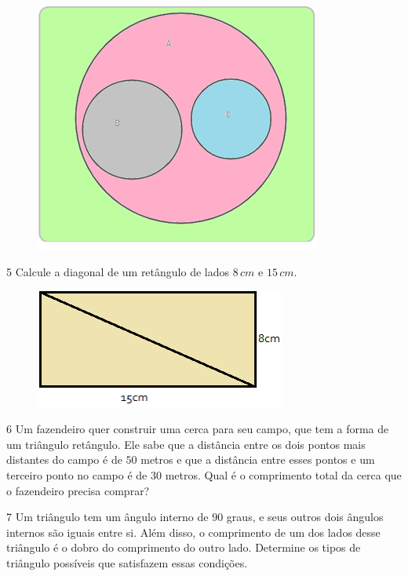 {\begin{figure}
\includegraphics[width=3.70833in,height=3.22917in]{./imgSAEB_6_MAT/media/image54.png}
\end{figure}

\num{5}  Calcule a diagonal de um retângulo de lados $8\,cm$ e $15\,cm$.

\begin{figure}
\includegraphics[width=3.24444in,height=1.54653in]{./imgSAEB_6_MAT/media/image55.png}
\end{figure}


\num{6}  Um fazendeiro quer construir uma cerca para seu campo, que tem a
forma de um triângulo retângulo. Ele sabe que a distância entre os dois
pontos mais distantes do campo é de $50$ metros e que a distância entre
esses pontos e um terceiro ponto no campo é de $30$ metros. Qual é o
comprimento total da cerca que o fazendeiro precisa comprar?


\num{7}  Um triângulo tem um ângulo interno de $90$ graus, e seus outros dois
ângulos internos são iguais entre si. Além disso, o comprimento de um
dos lados desse triângulo é o dobro do comprimento do outro lado.
Determine os tipos de triângulo possíveis que satisfazem essas
condições.

}
